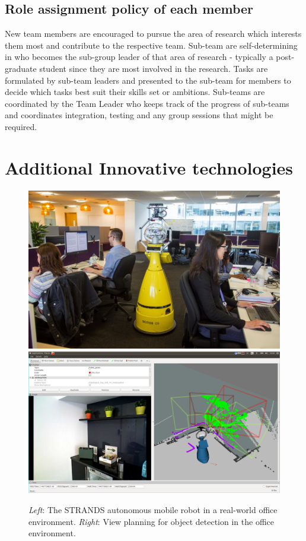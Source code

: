 \documentclass[runningheads,a4paper]{llncs}
\begin{document}

\subsection{Role assignment policy of each member}
New team members are encouraged to pursue the area of research which interests them most and contribute to the respective team. Sub-team are self-determining in who becomes the sub-group leader of that area of research - typically a post-graduate student since they are most involved in the research. Tasks are formulated by sub-team leaders and presented  to the sub-team for members to decide which tasks best suit their skills set or ambitions. Sub-teams are coordinated by the Team Leader who keeps track of the progress of sub-teams and coordinates integration, testing and any group sessions that might be required.

\section{Additional Innovative technologies}
\begin{figure}[tb]
  \begin{center}
    \includegraphics[width=.43\columnwidth]{images/betty.jpg}
    \includegraphics[width=.55\columnwidth,clip,trim=10ex 20ex 10ex 20ex]{images/viewplanning_at_tsc.png}
  \end{center} 
  \vspace{-10pt}  
  \caption{\textit{Left}: The STRANDS autonomous mobile robot in a real-world
  office environment. \textit{Right}: View planning for object detection in the
  office environment.}
  \label{fig:mk}
  \vspace{-3ex}
\end{figure}
\end{document}
